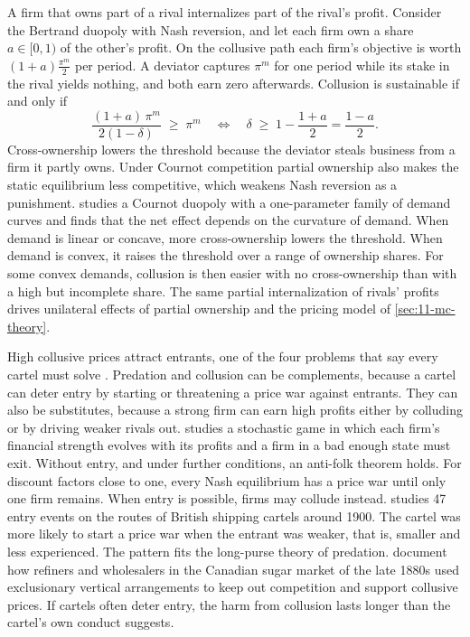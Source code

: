 A firm that owns part of a rival internalizes part of the rival's profit. Consider the Bertrand duopoly with Nash
reversion, and let each firm own a share $a \in [0,1)$ of the other's profit. On the collusive path each firm's
objective is worth $(1+a)\frac{\pi^m}{2}$ per period. A deviator captures $\pi^m$ for one period while its stake
in the rival yields nothing, and both earn zero afterwards. Collusion is sustainable if and only if
\begin{equation*}
  \frac{(1+a)\,\pi^m}{2(1-\delta)} \;\ge\; \pi^m
  \quad\Longleftrightarrow\quad
  \delta \;\ge\; 1 - \frac{1+a}{2} = \frac{1-a}{2} .
\end{equation*}
Cross-ownership lowers the threshold because the deviator steals business from a firm it partly owns. Under Cournot
competition partial ownership also makes the static equilibrium less competitive, which weakens Nash reversion as a
punishment.
\citet[pp.~29--34]{Malueg1992} studies a Cournot duopoly with a one-parameter family of demand curves and finds that
the net effect depends on the curvature of demand. When demand is linear or concave, more cross-ownership lowers the
threshold. When demand is convex, it raises the threshold over a range of ownership shares. For some convex demands,
collusion is then easier with no cross-ownership than with a high but incomplete share.
The same partial internalization of rivals' profits drives unilateral effects of partial ownership
\citep{OBrienSalop2000} and the pricing model of \cref{sec:11-mc-theory}.

High collusive prices attract entrants, one of the four problems that \citet{McAfeeMcMillan1992} say every cartel must
solve \citep[pp.~202 and~207--209]{AskerNocke2021}. Predation and collusion can be complements, because a cartel can
deter entry by starting or threatening a price war against entrants. They can also be substitutes, because a strong
firm can earn high profits either by colluding or by driving weaker rivals out. \citet{Wiseman2017} studies a
stochastic game in which each firm's financial strength evolves with its profits and a firm in a bad enough state must
exit. Without entry, and under further conditions, an anti-folk theorem holds. For discount factors close to one,
every Nash equilibrium has a price war until only one firm remains. When entry is possible, firms may collude instead.
\citet{ScottMorton1997} studies 47 entry events on the routes of British shipping cartels around 1900. The cartel was
more likely to start a price war when the entrant was weaker, that is, smaller and less experienced. The pattern fits
the long-purse theory of predation. \citet{AskerHemphill2020} document how refiners and wholesalers in the Canadian
sugar market of the late 1880s used exclusionary vertical arrangements to keep out competition and support collusive
prices. If cartels often deter entry, the harm from collusion lasts longer than the cartel's own conduct suggests.

